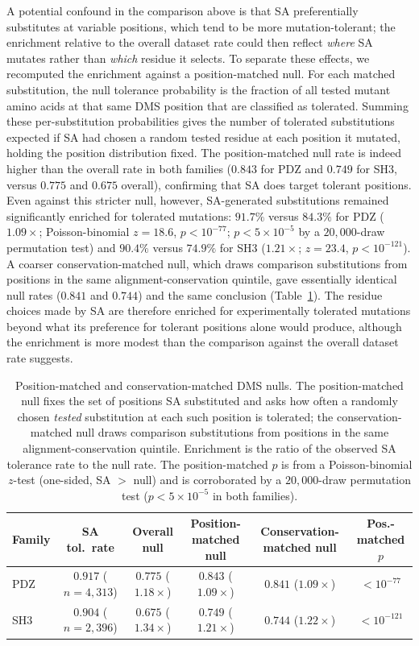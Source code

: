 A potential confound in the comparison above is that SA preferentially substitutes at variable positions, which tend to be more mutation-tolerant; the enrichment relative to the overall dataset rate could then reflect \emph{where} SA mutates rather than \emph{which} residue it selects. To separate these effects, we recomputed the enrichment against a position-matched null. For each matched substitution, the null tolerance probability is the fraction of all tested mutant amino acids at that same DMS position that are classified as tolerated. Summing these per-substitution probabilities gives the number of tolerated substitutions expected if SA had chosen a random tested residue at each position it mutated, holding the position distribution fixed. The position-matched null rate is indeed higher than the overall rate in both families ($0.843$ for PDZ and $0.749$ for SH3, versus $0.775$ and $0.675$ overall), confirming that SA does target tolerant positions. Even against this stricter null, however, SA-generated substitutions remained significantly enriched for tolerated mutations: $91.7\%$ versus $84.3\%$ for PDZ ($1.09\times$; Poisson-binomial $z{=}18.6$, $p < 10^{-77}$; $p < 5\times10^{-5}$ by a $20{,}000$-draw permutation test) and $90.4\%$ versus $74.9\%$ for SH3 ($1.21\times$; $z{=}23.4$, $p < 10^{-121}$). A coarser conservation-matched null, which draws comparison substitutions from positions in the same alignment-conservation quintile, gave essentially identical null rates ($0.841$ and $0.744$) and the same conclusion (Table~\ref{tab:dms-null}). The residue choices made by SA are therefore enriched for experimentally tolerated mutations beyond what its preference for tolerant positions alone would produce, although the enrichment is more modest than the comparison against the overall dataset rate suggests.

\begin{table}[ht]
\centering
\caption{Position-matched and conservation-matched DMS nulls. The position-matched null fixes the set of positions SA substituted and asks how often a randomly chosen \emph{tested} substitution at each such position is tolerated; the conservation-matched null draws comparison substitutions from positions in the same alignment-conservation quintile. Enrichment is the ratio of the observed SA tolerance rate to the null rate. The position-matched $p$ is from a Poisson-binomial $z$-test (one-sided, SA $>$ null) and is corroborated by a $20{,}000$-draw permutation test ($p < 5\times10^{-5}$ in both families).}
\label{tab:dms-null}
\small
\begin{tabular}{@{}lccccc@{}}
\toprule
Family & SA tol.\ rate & Overall null & Position-matched null & Conservation-matched null & Pos.-matched $p$ \\
\midrule
PDZ & $0.917$ ($n{=}4{,}313$) & $0.775$ ($1.18\times$) & $0.843$ ($1.09\times$) & $0.841$ ($1.09\times$) & $<10^{-77}$ \\
SH3 & $0.904$ ($n{=}2{,}396$) & $0.675$ ($1.34\times$) & $0.749$ ($1.21\times$) & $0.744$ ($1.22\times$) & $<10^{-121}$ \\
\bottomrule
\end{tabular}
\end{table}

